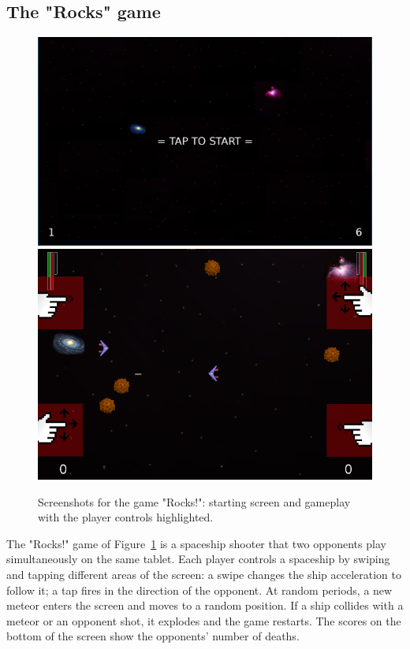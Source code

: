 \documentclass[preprint]{sigplanconf}
\newcommand{\1}{\;}
\newcommand{\2}{\;\;}
\newcommand{\3}{\;\;\;}
\newcommand{\5}{\;\;\;\;\;}
\begin{document}

\subsection{The "Rocks" game}

\begin{figure}%
\centering
\includegraphics[scale=0.223]{screen-0.png}
\\
\includegraphics[scale=0.45]{screenshot.png}
\caption{
Screenshots for the game "Rocks!":
starting screen and gameplay with the player controls highlighted.
\label{fig.rocks}
}
\end{figure}

The "Rocks!" game of Figure~\ref{fig.rocks} is a spaceship shooter that two 
opponents play simultaneously on the same tablet.
Each player controls a spaceship by swiping and tapping different areas of the 
screen:
a swipe changes the ship acceleration to follow it;
a tap fires in the direction of the opponent.
At random periods, a new meteor enters the screen and moves to a random 
position.
If a ship collides with a meteor or an opponent shot, it explodes and the game 
restarts.
The scores on the bottom of the screen show the opponents' number of deaths.
\end{document}

